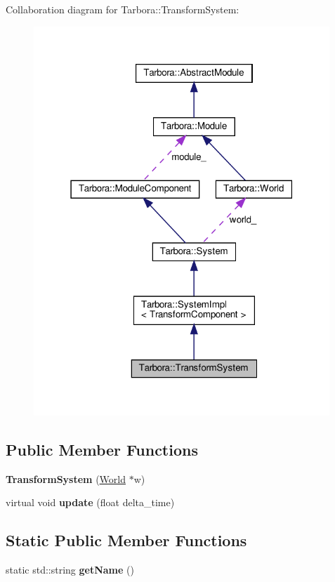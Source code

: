 Collaboration diagram for Tarbora\+:\+:Transform\+System\+:
\nopagebreak
\begin{figure}[H]
\begin{center}
\leavevmode
\includegraphics[width=316pt]{classTarbora_1_1TransformSystem__coll__graph}
\end{center}
\end{figure}
\subsection*{Public Member Functions}
\begin{DoxyCompactItemize}
\item 
\mbox{\label{classTarbora_1_1TransformSystem_a90c94d281be61420d0eb656837c3509a}} 
{\bfseries Transform\+System} (\hyperlink{classTarbora_1_1World}{World} $\ast$w)
\item 
\mbox{\label{classTarbora_1_1TransformSystem_a90f8cb678cd0d373fabb39708bcc4b34}} 
virtual void {\bfseries update} (float delta\+\_\+time)
\end{DoxyCompactItemize}
\subsection*{Static Public Member Functions}
\begin{DoxyCompactItemize}
\item 
\mbox{\label{classTarbora_1_1TransformSystem_ac667d039fdd357c857902804138a7c53}} 
static std\+::string {\bfseries get\+Name} ()
\end{DoxyCompactItemize}
